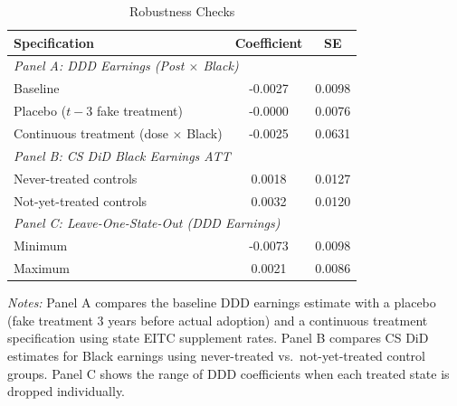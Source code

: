 \begin{table}[htbp]
\centering
\caption{Robustness Checks}
\label{tab:robust}
\begin{tabular}{lcc}
\toprule
Specification & Coefficient & SE \\
\midrule
\multicolumn{3}{l}{\textit{Panel A: DDD Earnings (Post $\times$ Black)}} \\
Baseline & -0.0027 & 0.0098 \\
Placebo ($t-3$ fake treatment) & -0.0000 & 0.0076 \\
Continuous treatment (dose $\times$ Black) & -0.0025 & 0.0631 \\
\midrule
\multicolumn{3}{l}{\textit{Panel B: CS DiD Black Earnings ATT}} \\
Never-treated controls & 0.0018 & 0.0127 \\
Not-yet-treated controls & 0.0032 & 0.0120 \\
\midrule
\multicolumn{3}{l}{\textit{Panel C: Leave-One-State-Out (DDD Earnings)}} \\
Minimum & -0.0073 & 0.0098 \\
Maximum & 0.0021 & 0.0086 \\
\bottomrule
\end{tabular}
\begin{tablenotes}
\item \textit{Notes:} Panel A compares the baseline DDD earnings estimate with a placebo (fake treatment 3 years before actual adoption) and a continuous treatment specification using state EITC supplement rates. Panel B compares CS DiD estimates for Black earnings using never-treated vs.\ not-yet-treated control groups. Panel C shows the range of DDD coefficients when each treated state is dropped individually.
\end{tablenotes}
\end{table}

